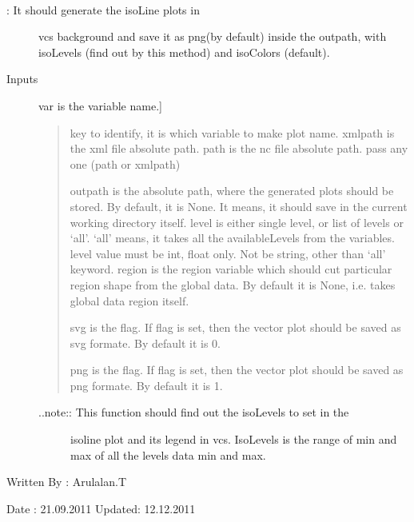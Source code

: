 \documentclass[letterpaper,10pt,english]{sphinxmanual}
\begin{document}

\begin{fulllineitems}
\label{diagnosis:generate_iso_plots.genIsoLinePlots}~\begin{description}
\item[{{\hyperref[diagnosis:generate_iso_plots.genIsoLinePlots]{}}: It should generate the isoLine plots in}] \leavevmode
vcs background and save it as png(by default) inside the outpath,
with isoLevels (find out by this method) and isoColors (default).

\item[{Inputs}] \leavevmode{[}var is the variable name.{]}\begin{quote}

key to identify, it is which variable to make plot name.
xmlpath is the xml file absolute path.
path is the nc file absolute path.
pass any one (path or xmlpath)

outpath is the absolute path, where the generated plots should be
stored. By default, it is None. It means, it should save in the
current working directory itself.
level is either single level, or list of levels or `all'.
`all' means, it takes all the availableLevels from the variables.
level value must be int, float only. Not be string, other than
`all' keyword.
region is the region variable which should cut particular region
shape from the global data. By default it is None, i.e. takes
global data region itself.

svg is the flag. If flag is set, then the vector plot should be
saved as svg formate. By default it is 0.

png is the flag. If flag is set, then the vector plot should be
saved as png formate. By default it is 1.
\end{quote}
\begin{description}
\item[{..note:: This function should find out the isoLevels to set in the}] \leavevmode
isoline plot and its legend in vcs. IsoLevels is the range of min and
max of all the levels data min and max.

\end{description}

\end{description}

Written By : Arulalan.T

Date : 21.09.2011
Updated: 12.12.2011

\end{fulllineitems}
\end{document}
